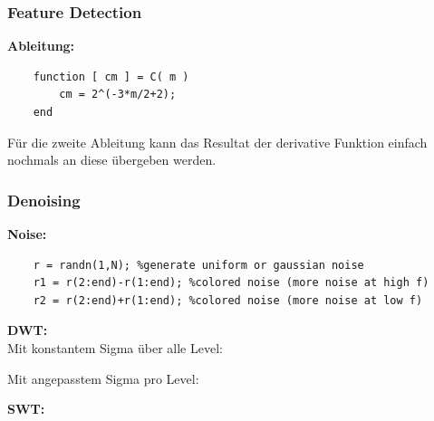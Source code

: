\subsubsection{Feature Detection}
\textbf{Ableitung:}

\vspace{-0.4cm}

\begin{lstlisting}
	function [ cm ] = C( m )
		cm = 2^(-3*m/2+2);
	end
\end{lstlisting}



Für die zweite Ableitung kann das Resultat der derivative Funktion einfach nochmals an diese übergeben werden.



\subsubsection{Denoising}

\textbf{Noise:}

\vspace{-0.4cm}

\begin{lstlisting}
	r = randn(1,N); %generate uniform or gaussian noise
	r1 = r(2:end)-r(1:end); %colored noise (more noise at high f)
	r2 = r(2:end)+r(1:end); %colored noise (more noise at low f)
\end{lstlisting}

\textbf{DWT:}\\
Mit konstantem Sigma über alle Level:

\vspace{-0.4cm}



Mit angepasstem Sigma pro Level:

\vspace{-0.4cm}


\newpage


\newpage
\textbf{SWT:}

\vspace{-0.4cm}




